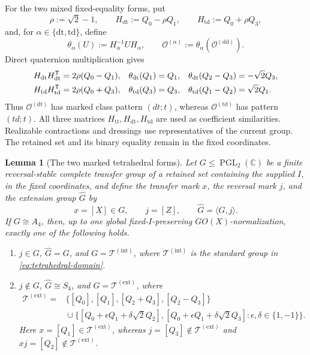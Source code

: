 \documentclass[11pt,letterpaper,onecolumn]{article}
\theoremstyle{plain}
\newtheorem{lemma}[lemma]{Lemma}
\theoremstyle{definition}
\theoremstyle{remark}
\newcommand{\TetInt}{{\mathcal T^{(\mathrm{int})}}}
\newcommand{\TetExt}{{\mathcal T^{(\mathrm{ext})}}}
\newcommand{\OctDD}{{\mathcal O^{(\mathrm{dd})}}}
\newcommand{\OctDT}{{\mathcal O^{(\mathrm{dt})}}}
\newcommand{\OctTD}{{\mathcal O^{(\mathrm{td})}}}
\newcommand{\OctForm}[1]{{\mathcal O^{(#1)}}}
\newcommand{\PGL}{\operatorname{PGL}}
\begin{document}
For the two mixed fixed-equality forms, put
\begin{equation}
 \rho:=\sqrt2-1,\qquad
 H_{\mathrm{dt}}:=Q_0-\rho Q_1,\qquad
 H_{\mathrm{td}}:=Q_0+\rho Q_3,
 \label{eq:octahedral-mixed-conjugators}
\end{equation}
and, for \(\alpha\in\{\mathrm{dt},\mathrm{td}\}\), define
\begin{equation}
 \theta_\alpha(U):=H_\alpha^{-1}UH_\alpha,\qquad
 \OctForm{\alpha}:=\theta_\alpha(\OctDD).
 \label{eq:octahedral-mixed-forms}
\end{equation}
Direct quaternion multiplication gives
\begin{align}
 H_{\mathrm{dt}}H_{\mathrm{dt}}^{\mathsf T}&=2\rho(Q_0-Q_1),&
 \theta_{\mathrm{dt}}(Q_1)&=Q_1,&
 \theta_{\mathrm{dt}}(Q_2-Q_3)&=-\sqrt2Q_3,\notag\\
 H_{\mathrm{td}}H_{\mathrm{td}}^{\mathsf T}&=2\rho(Q_0+Q_3),&
 \theta_{\mathrm{td}}(Q_3)&=Q_3,&
 \theta_{\mathrm{td}}(Q_1-Q_2)&=\sqrt2Q_1.
 \label{eq:octahedral-mixed-mark-check}
\end{align}
Thus \(\OctDT\) has marked class pattern \((dt;t)\), whereas
\(\OctTD\) has pattern \((td;t)\).  All three matrices \(H_{\mathrm{tt}},H_{\mathrm{dt}},H_{\mathrm{td}}\) are used as coefficient
similarities.  Realizable contractions and dressings use representatives of
the current group. The retained set and its binary equality
remain in the fixed coordinates.


\begin{lemma}[The two marked tetrahedral forms]
\label{lem:marked-a4-forms}
Let \(G\leq\PGL_2(\mathbb C)\) be a finite reversal-stable complete transfer group of a retained set
containing the supplied \(I\), in the fixed coordinates, and define the transfer mark \(x\), the reversal mark \(j\), and the extension group \(\widehat G\) by
\[
  x=[X]\in G,\qquad j=[Z],\qquad \widehat G=\langle G,j\rangle.
\]
If \(G\cong A_4\), then, up to one global fixed-\(I\)-preserving
\(GO(X)\)-normalization, exactly one of the following
holds.
\begin{enumerate}
\item \(j\in G\), \(\widehat G=G\), and \(G=\TetInt\), where
      \(\TetInt\) is the standard group in
      \cref{eq:tetrahedral-domain}.
\item \(j\notin G\), \(\widehat G\cong S_4\), and \(G=\TetExt\), where
\hypertarget{eq:external-a4-domain}{}
\begin{equation*}
\begin{aligned}
 \TetExt
 ={}&\{[Q_0],[Q_1],[Q_2+Q_3],[Q_2-Q_3]\}\\
 &{}\cup
 \{[Q_0+\epsilon Q_1+\delta\sqrt2Q_2],
    [Q_0+\epsilon Q_1+\delta\sqrt2Q_3]:
       \epsilon,\delta\in\{1,-1\}\}.
\end{aligned}
\end{equation*}
Here \(x=[Q_1]\in\TetExt\), whereas
\(j=[Q_3]\notin\TetExt\) and
\(xj=[Q_2]\notin\TetExt\).
\end{enumerate}
\end{lemma}
\end{document}
